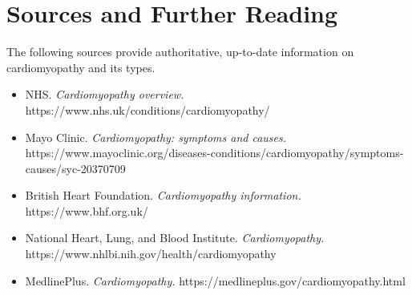 \section*{Sources and Further Reading}
The following sources provide authoritative, up-to-date information on cardiomyopathy and its types.
\begin{itemize}
    \item NHS. \textit{Cardiomyopathy overview.} https://www.nhs.uk/conditions/cardiomyopathy/
    \item Mayo Clinic. \textit{Cardiomyopathy: symptoms and causes.} https://www.mayoclinic.org/diseases-conditions/cardiomyopathy/symptoms-causes/syc-20370709
    \item British Heart Foundation. \textit{Cardiomyopathy information.} https://www.bhf.org.uk/
    \item National Heart, Lung, and Blood Institute. \textit{Cardiomyopathy.} https://www.nhlbi.nih.gov/health/cardiomyopathy
    \item MedlinePlus. \textit{Cardiomyopathy.} https://medlineplus.gov/cardiomyopathy.html
\end{itemize}
